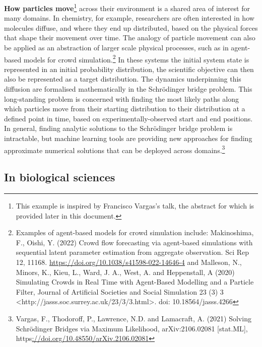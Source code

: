 \textbf{How particles move}\footnote{This example is inspired by
  Francisco Vargas's talk, the abstract for which is provided later in
  this document.} across their environment is a shared area of interest
for many domains. In chemistry, for example, researchers are often
interested in how molecules diffuse, and where they end up distributed,
based on the physical forces that shape their movement over time. The
analogy of particle movement can also be applied as an abstraction of
larger scale physical processes, such as in agent-based models for crowd
simulation.\footnote{Examples of agent-based models for crowd simulation
  include: Makinoshima, F., Oishi, Y. (2022) Crowd flow forecasting via
  agent-based simulations with sequential latent parameter estimation
  from aggregate observation. Sci Rep 12, 11168.
  \href{https://doi.org/10.1038/s41598-022-14646-4}{\uline{https://doi.org/10.1038/s41598-022-14646-4}}
  and Malleson, N., Minors, K., Kieu, L., Ward, J. A., West, A. and
  Heppenstall, A (2020) Simulating Crowds in Real Time with Agent-Based
  Modelling and a Particle Filter, Journal of Artificial Societies and
  Social Simulation 23 (3) 3
  \textless http://jasss.soc.surrey.ac.uk/23/3/3.html\textgreater. doi:
  10.18564/jasss.4266} In these systems the initial system state is
represented in an initial probability distribution, the scientific
objective can then also be represented as a target distribution. The
dynamics underpinning this diffusion are formalised mathematically in
the Schrödinger bridge problem. This long-standing problem is concerned
with finding the most likely paths along which particles move from their
starting distribution to their distribution at a defined point in time,
based on experimentally-observed start and end positions. In general,
finding analytic solutions to the Schrödinger bridge problem is
intractable, but machine learning tools are providing new approaches for
finding approximate numerical solutions that can be deployed across
domains.\footnote{Vargas, F., Thodoroff, P., Lawrence, N.D. and
  Lamacraft, A. (2021) Solving Schrödinger Bridges via Maximum
  Likelihood, arXiv:2106.02081 {[}stat.ML{]},
  https\uline{://doi.org/10.48550/arXiv.2106.02081}}

\subsection{In biological sciences}\label{in-biological-sciences}

